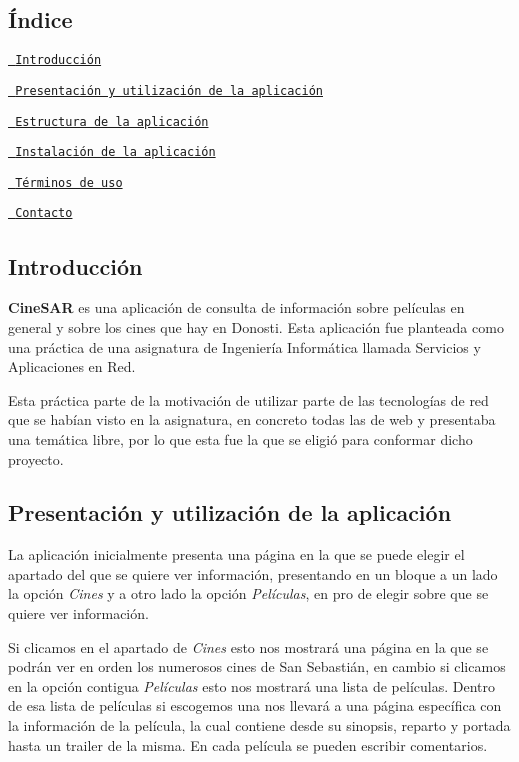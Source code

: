 \subsection*{Índice}


\begin{DoxyEnumerate}
\item \href{\#introducción}{\texttt{ Introducción}}
\item \href{\#presentación-y-utilización-de-la-aplicación}{\texttt{ Presentación y utilización de la aplicación}}
\item \href{\#estructura-de-la-aplicación}{\texttt{ Estructura de la aplicación}}
\item \href{\#instalación-de-la-aplicación}{\texttt{ Instalación de la aplicación}}
\item \href{\#términos-de-uso}{\texttt{ Términos de uso}}
\item \href{\#contacto}{\texttt{ Contacto}}
\end{DoxyEnumerate}

\subsection*{Introducción}

{\bfseries{Cine\+S\+AR}} es una aplicación de consulta de información sobre películas en general y sobre los cines que hay en Donosti. Esta aplicación fue planteada como una práctica de una asignatura de Ingeniería Informática llamada Servicios y Aplicaciones en Red.



Esta práctica parte de la motivación de utilizar parte de las tecnologías de red que se habían visto en la asignatura, en concreto todas las de web y presentaba una temática libre, por lo que esta fue la que se eligió para conformar dicho proyecto.

\subsection*{Presentación y utilización de la aplicación}

La aplicación inicialmente presenta una página en la que se puede elegir el apartado del que se quiere ver información, presentando en un bloque a un lado la opción {\itshape Cines} y a otro lado la opción {\itshape Películas}, en pro de elegir sobre que se quiere ver información.

Si clicamos en el apartado de {\itshape Cines} esto nos mostrará una página en la que se podrán ver en orden los numerosos cines de San Sebastián, en cambio si clicamos en la opción contigua {\itshape Películas} esto nos mostrará una lista de películas. Dentro de esa lista de películas si escogemos una nos llevará a una página específica con la información de la película, la cual contiene desde su sinopsis, reparto y portada hasta un trailer de la misma. En cada película se pueden escribir comentarios.

